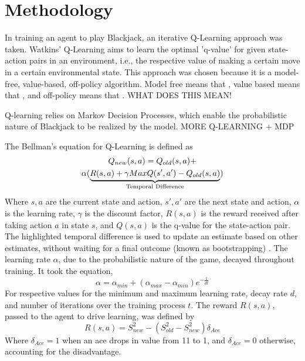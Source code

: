 \section{Methodology}

In training an agent to play Blackjack, an iterative Q-Learning approach was taken. Watkins' Q-Learning aims to learn the optimal 'q-value' for given state-action pairs in an environment, i.e., the respective value of making a certain move in a certain environmental state. This approach was chosen because it is a model-free, value-based, off-policy algorithm. Model free means that , value based means that  , and off-policy means that   .
WHAT DOES THIS MEAN!  

Q-learning relies on Markov Decision Processes, which enable the probabilistic nature of Blackjack to be realized by the model. MORE Q-LEARNING + MDP

The Bellman's equation for Q-Learning is defined as
\begin{multline} \label{eq:Bellman}
    Q_{new}(s,a)=Q_{old}(s,a)+\\\alpha(\underbrace{R(s,a)+\gamma MaxQ(s',a')-Q_{old}(s,a)}_{\mathclap{\text{Temporal Difference}}})
\end{multline}
Where \( s, a \) are the current state and action,  \( s', a' \) are the next state and action, \( \alpha \) is the learning rate, \( \gamma \) is the discount factor, \( R(s,a) \) is the reward received after taking action \( a \) in state \( s \), and \( Q(s,a) \) is the q-value for the state-action pair. The highlighted temporal difference is used to update an estimate based on other estimates, without waiting for a final outcome (known as bootstrapping) \cite{10.5555/3312046}. The learning rate \(\alpha\), due to the probabilistic nature of the game, decayed throughout training. It took the equation, 
\begin{equation}
    \alpha = \alpha_{min} + (\alpha_{max} - \alpha_{min})e^{-\frac{1}{dt}}
\end{equation}
For respective values for the minimum and maximum learning rate, decay rate \(d\), and number of iterations over the training process \(t\). The reward \(R(s,a)\), passed to the agent to drive learning, was defined by
\begin{equation} \label{reward}
    R(s,a) = S_{new}^2 - (S_{old}^2 - S_{new}^2)\delta_{Ace}
\end{equation}
Where \(\delta_{Ace}=1\) when an ace drops in value from 11 to 1, and \(\delta_{Ace}=0\) otherwise, accounting for the disadvantage.

